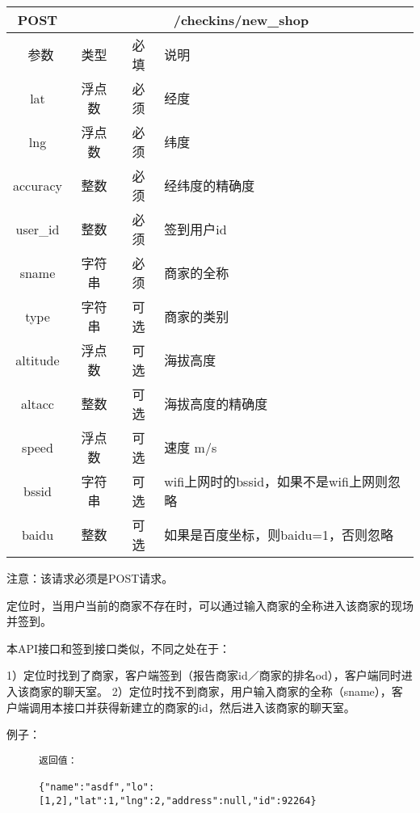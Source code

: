 \documentclass[cs4size]{ctexartutf8}
\begin{document}
\begin{table}[H]
   \begin{center}
\begin{tabular}{|c|c|c|p{12cm}|}
\hline
POST & \multicolumn{3}{|c|}{/checkins/new\_shop} \\
\hline\hline
 \  参数  & 类型 & 必填 &  说明  \\
\hline
 lat  & 浮点数 & 必须 & 经度\\
\hline
 lng  &  浮点数 & 必须 & 纬度\\ 
\hline
 accuracy  & 整数 & 必须 & 经纬度的精确度\\ 
\hline
 user\_id  & 整数 & 必须 &  签到用户id\\ 
\hline
 sname  & 字符串 & 必须 &  商家的全称\\  
\hline
 type  & 字符串 & 可选 &  商家的类别\\   
\hline
 altitude  &  浮点数 & 可选 & 海拔高度\\ 
\hline
 altacc  & 整数 & 可选 & 海拔高度的精确度\\  
 \hline
 speed  & 浮点数 & 可选 & 速度 m/s\\   
\hline
 bssid  & 字符串 & 可选 & wifi上网时的bssid，如果不是wifi上网则忽略\\  
 \hline
 baidu  & 整数 & 可选 & 如果是百度坐标，则baidu=1，否则忽略\\  
\hline
\end{tabular}
   \end{center}
\end{table}

注意：该请求必须是POST请求。

定位时，当用户当前的商家不存在时，可以通过输入商家的全称进入该商家的现场并签到。

本API接口和签到接口类似，不同之处在于：

1）定位时找到了商家，客户端签到（报告商家id／商家的排名od），客户端同时进入该商家的聊天室。
2）定位时找不到商家，用户输入商家的全称（sname），客户端调用本接口并获得新建立的商家的id，然后进入该商家的聊天室。


例子：

\begin{figure}[H]
\begin{verbatim}
返回值：

{"name":"asdf","lo":[1,2],"lat":1,"lng":2,"address":null,"id":92264}


\end{verbatim}
\end{figure}
\end{document}
